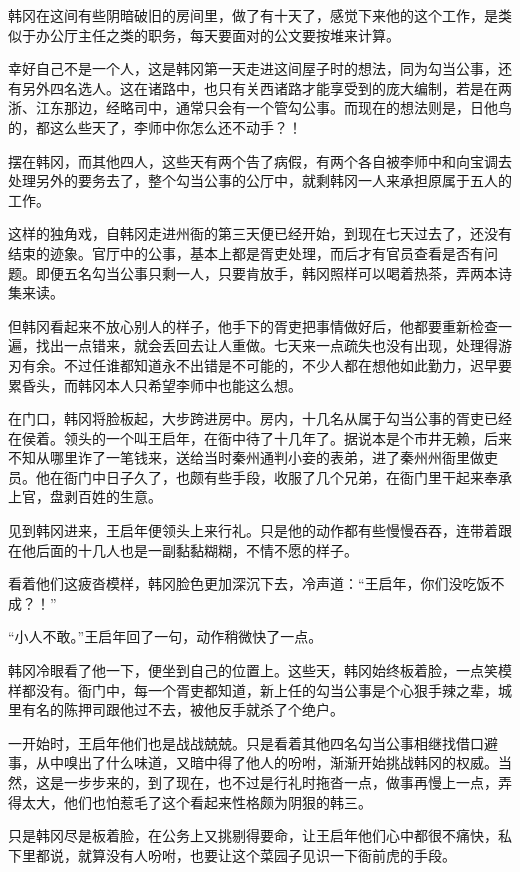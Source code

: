 韩冈在这间有些阴暗破旧的房间里，做了有十天了，感觉下来他的这个工作，是类似于办公厅主任之类的职务，每天要面对的公文要按堆来计算。

幸好自己不是一个人，这是韩冈第一天走进这间屋子时的想法，同为勾当公事，还有另外四名选人。这在诸路中，也只有关西诸路才能享受到的庞大编制，若是在两浙、江东那边，经略司中，通常只会有一个管勾公事。而现在的想法则是，日他鸟的，都这么些天了，李师中你怎么还不动手？！

摆在韩冈，而其他四人，这些天有两个告了病假，有两个各自被李师中和向宝调去处理另外的要务去了，整个勾当公事的公厅中，就剩韩冈一人来承担原属于五人的工作。

这样的独角戏，自韩冈走进州衙的第三天便已经开始，到现在七天过去了，还没有结束的迹象。官厅中的公事，基本上都是胥吏处理，而后才有官员查看是否有问题。即便五名勾当公事只剩一人，只要肯放手，韩冈照样可以喝着热茶，弄两本诗集来读。

但韩冈看起来不放心别人的样子，他手下的胥吏把事情做好后，他都要重新检查一遍，找出一点错来，就会丢回去让人重做。七天来一点疏失也没有出现，处理得游刃有余。不过任谁都知道永不出错是不可能的，不少人都在想他如此勤力，迟早要累昏头，而韩冈本人只希望李师中也能这么想。

在门口，韩冈将脸板起，大步跨进房中。房内，十几名从属于勾当公事的胥吏已经在侯着。领头的一个叫王启年，在衙中待了十几年了。据说本是个市井无赖，后来不知从哪里诈了一笔钱来，送给当时秦州通判小妾的表弟，进了秦州州衙里做吏员。他在衙门中日子久了，也颇有些手段，收服了几个兄弟，在衙门里干起来奉承上官，盘剥百姓的生意。

见到韩冈进来，王启年便领头上来行礼。只是他的动作都有些慢慢吞吞，连带着跟在他后面的十几人也是一副黏黏糊糊，不情不愿的样子。

看着他们这疲沓模样，韩冈脸色更加深沉下去，冷声道：“王启年，你们没吃饭不成？！”

“小人不敢。”王启年回了一句，动作稍微快了一点。

韩冈冷眼看了他一下，便坐到自己的位置上。这些天，韩冈始终板着脸，一点笑模样都没有。衙门中，每一个胥吏都知道，新上任的勾当公事是个心狠手辣之辈，城里有名的陈押司跟他过不去，被他反手就杀了个绝户。

一开始时，王启年他们也是战战兢兢。只是看着其他四名勾当公事相继找借口避事，从中嗅出了什么味道，又暗中得了他人的吩咐，渐渐开始挑战韩冈的权威。当然，这是一步步来的，到了现在，也不过是行礼时拖沓一点，做事再慢上一点，弄得太大，他们也怕惹毛了这个看起来性格颇为阴狠的韩三。

只是韩冈尽是板着脸，在公务上又挑剔得要命，让王启年他们心中都很不痛快，私下里都说，就算没有人吩咐，也要让这个菜园子见识一下衙前虎的手段。

